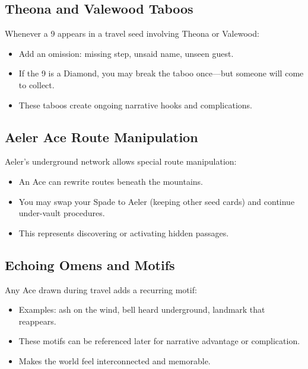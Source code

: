 \subsection{Theona and Valewood Taboos}
\label{subsec:theona-taboos}

Whenever a 9 appears in a travel seed involving Theona or Valewood:
\begin{itemize}
\item Add an omission: missing step, unsaid name, unseen guest.
\item If the 9 is a Diamond, you may break the taboo once—but someone will come to collect.
\item These taboos create ongoing narrative hooks and complications.
\end{itemize}

\subsection{Aeler Ace Route Manipulation}
\label{subsec:aeler-aces}

Aeler's underground network allows special route manipulation:
\begin{itemize}
\item An Ace can rewrite routes beneath the mountains.
\item You may swap your Spade to Aeler (keeping other seed cards) and continue under-vault procedures.
\item This represents discovering or activating hidden passages.
\end{itemize}

\subsection{Echoing Omens and Motifs}
\label{subsec:echoing-omens}

Any Ace drawn during travel adds a recurring motif:
\begin{itemize}
\item Examples: ash on the wind, bell heard underground, landmark that reappears.
\item These motifs can be referenced later for narrative advantage or complication.
\item Makes the world feel interconnected and memorable.
\end{itemize}

